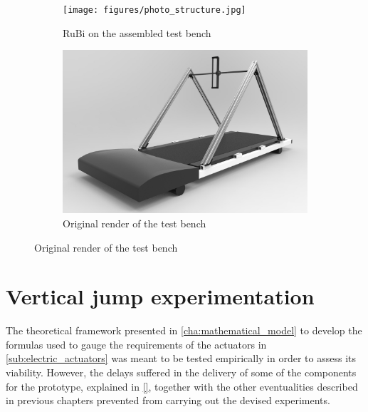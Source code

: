 \begin{figure}[ht!]
    \centering
    \begin{subfigure}[b]{0.49\textwidth}
        \texttt{[image: figures/photo\_structure.jpg]}
        \caption{RuBi on the assembled test bench}
        \label{fig:photo_structure}
    \end{subfigure}
    \begin{subfigure}[b]{0.49\textwidth}
        \includegraphics[width=\textwidth]{figures/legs_structure.jpg}
        \caption{Original render of the test bench}
        \label{fig:legs_structure}
    \end{subfigure}
\end{figure}  



\section{Vertical jump experimentation} %
\label{sec:vertical_jump_experimentation}
The theoretical framework presented in \ref{cha:mathematical_model} to develop the formulas used to gauge the requirements of the actuators in \ref{sub:electric_actuators} was meant to be tested empirically in order to assess its viability.
However, the delays suffered in the delivery of some of the components for the prototype, explained in \ref{}, 
together with the other eventualities described in previous chapters prevented from carrying out the devised experiments.

